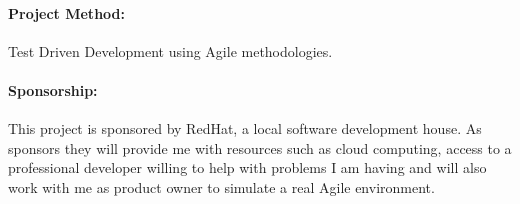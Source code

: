 \documentclass{article}
\begin{document}
\newpage

\paragraph{Project Method:}
\label{par:Project Method}
Test Driven Development using Agile methodologies.

\paragraph{Sponsorship:}
This project is sponsored by RedHat, a local software development house. As sponsors they will provide me with resources such as cloud computing, access to a professional developer willing to help with problems I am having and will also work with me as product owner to simulate a real Agile environment.
\end{document}
